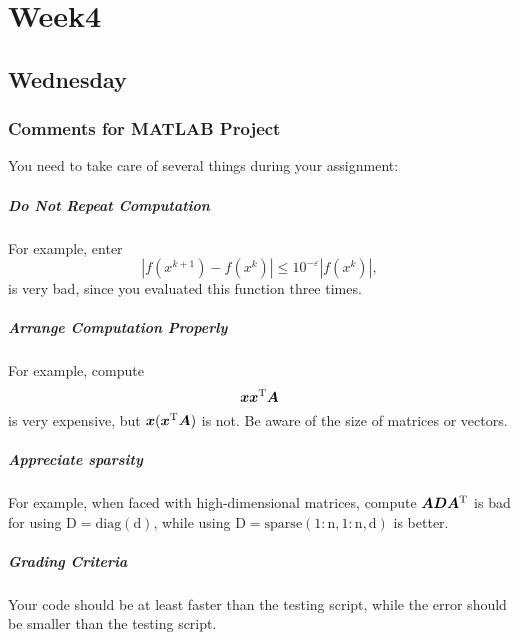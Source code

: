 
\chapter{Week4}

\section{Wednesday}
\subsection{Comments for MATLAB Project}
You need to take care of several things during your assignment:
\paragraph{Do Not Repeat Computation} For example, 
enter
\[
|f(x^{k+1}) - f(x^k)|\le 10^{-\varepsilon}|f(x^k)|,
\]
is very bad, since you evaluated this function three times.
\paragraph{Arrange Computation Properly} For example, compute
\[
\bm x\bm x^{\mathrm T}\bm A
\]
is very expensive, but $\bm x(\bm x^{\mathrm T}\bm A)$ is not. Be aware of the size of matrices or vectors.
\paragraph{Appreciate sparsity} For example, when faced with high-dimensional matrices, compute $\bm A\bm D\bm A^{\mathrm T}$ is bad for using $\mathrm{D = diag(d)}$, while using $\mathrm{D = sparse(1:n,1:n,d)}$ is better.
\paragraph{Grading Criteria}
Your code should be at least faster than the testing script, while the error should be smaller than the testing script.

